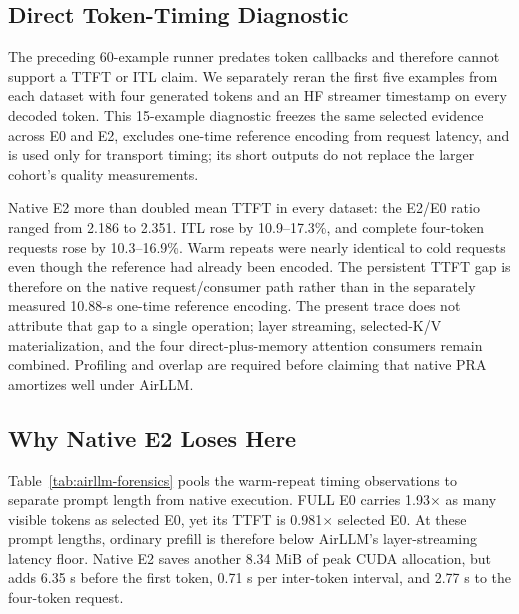 \documentclass[10pt]{article}
\begin{document}
\subsection{Direct Token-Timing Diagnostic}

The preceding 60-example runner predates token callbacks and therefore cannot
support a TTFT or ITL claim.  We separately reran the first five examples from
each dataset with four generated tokens and an HF streamer timestamp on every
decoded token.  This 15-example diagnostic freezes the same selected evidence
across E0 and E2, excludes one-time reference encoding from request latency,
and is used only for transport timing; its short outputs do not replace the
larger cohort's quality measurements.

\begin{table}[t]
\centering
\scriptsize
\caption{Directly measured AirLLM/HF timing on the RTX 5060. Times are
milliseconds; each cell averages five requests. Ratios are E2 divided by E0,
so values above one favor selected-text E0. Completion is the complete
four-token request ratio.}
\label{tab:cuda-natural-timing}

\end{table}

Native E2 more than doubled mean TTFT in every dataset: the E2/E0 ratio ranged
from 2.186 to 2.351.  ITL rose by 10.9--17.3\%, and complete four-token requests
rose by 10.3--16.9\%.  Warm repeats were nearly identical to cold requests even
though the reference had already been encoded.  The persistent TTFT gap is
therefore on the native request/consumer path rather than in the separately
measured 10.88-s one-time reference encoding.  The present trace does not
attribute that gap to a single operation; layer streaming, selected-K/V
materialization, and the four direct-plus-memory attention consumers remain
combined.  Profiling and overlap are required before claiming that native PRA
amortizes well under AirLLM.

\subsection{Why Native E2 Loses Here}

Table~\ref{tab:airllm-forensics} pools the warm-repeat timing observations to
separate prompt length from native execution. FULL E0 carries 1.93$\times$ as
many visible tokens as selected E0, yet its TTFT is 0.981$\times$ selected E0.
At these prompt lengths, ordinary prefill is therefore below AirLLM's
layer-streaming latency floor. Native E2 saves another 8.34 MiB of peak CUDA
allocation, but adds 6.35 s before the first token, 0.71 s per inter-token
interval, and 2.77 s to the four-token request.
\end{document}

